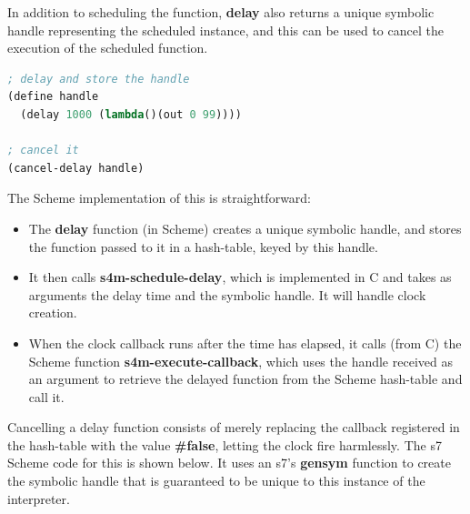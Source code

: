 \documentclass[acmsmall, anonymous, review]{acmart}
\begin{document}
In addition to scheduling the function, \textbf{delay} also returns a unique
symbolic handle representing the scheduled instance, and this can be used to 
cancel the execution of the scheduled function.

\begin{lstlisting}[language=lisp]
; delay and store the handle
(define handle 
  (delay 1000 (lambda()(out 0 99))))

; cancel it
(cancel-delay handle)
\end{lstlisting}

The Scheme implementation of this is straightforward:

\begin{itemize}
\item The \textbf{delay} function (in Scheme) creates a unique symbolic handle, and stores the 
  function passed to it in a hash-table, keyed by this handle.
\item It then calls \textbf{s4m-schedule-delay}, which is implemented
  in C and takes as arguments the delay time and the symbolic handle. It will handle 
  clock creation.
\item When the clock callback runs after the time has elapsed, it calls (from C) the Scheme function 
  \textbf{s4m-execute-callback}, which uses the handle received as an argument 
  to retrieve the delayed function from the Scheme hash-table and call it.
\end{itemize}

Cancelling a delay function consists of merely replacing the callback registered
in the hash-table with the value \textbf{\#false}, letting the clock fire harmlessly.
The s7 Scheme code for this is shown below. It uses an s7's \textbf{gensym} function to create the
symbolic handle that is guaranteed to be unique to this instance of the interpreter.
\end{document}
